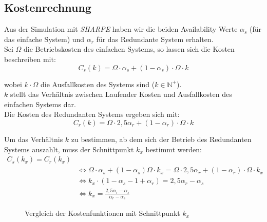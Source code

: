 \documentclass[
            a4paper
            ]{scrartcl}%
\begin{document}
\subsection{Kostenrechnung}
Aus der Simulation mit \emph{SHARPE} haben wir die beiden Availability Werte $\alpha_s$ (für das einfache System) und $\alpha_r$ für das Redundante System erhalten.\\
Sei $\Omega$ die Betriebskosten des einfachen Systems, so lassen sich die Kosten beschreiben mit:
\begin{equation}
C_s(k) = \Omega \cdot \alpha_s + (1-\alpha_s)\cdot \Omega \cdot k
\end{equation}

wobei $k \cdot \Omega$ die Ausfallkosten des Systems sind ($k \in
\mathbb{N}^+$).\\$k$ stellt das Verhältnis zwischen Laufender Kosten und Ausfallkosten des einfachen Systems dar.\\
Die Kosten des Redundanten Systems ergeben sich mit: 
\begin{equation}
C_r(k) = \Omega \cdot 2,5 \alpha_r + (1- \alpha_r) \cdot \Omega \cdot k
\end{equation}

Um das Verhältnis $k$ zu bestimmen, ab dem sich der Betrieb des Redundanten Systems auszahlt, muss der Schnittpunkt $k_x$ bestimmt werden:
\begin{equation}
\begin{split}
C_s(k_x) = C_r(k_x) \\ &
 \Leftrightarrow
\Omega \cdot \alpha_s + (1-\alpha_s)\Omega \cdot k_x = \Omega \cdot 2,5 \alpha_r + (1- \alpha_r) \cdot \Omega \cdot k_x \\ & \Leftrightarrow
k_x \cdot (1 - \alpha_s - 1 + \alpha_r) = 2,5 \alpha_r - \alpha_s \\ & \Leftrightarrow
k_x = \frac{2,5 \alpha_r - \alpha_s}{\alpha_r - \alpha_s}
\end{split}
\end{equation}

\begin{figure}
\centering
{}
\caption{Vergleich der Kostenfunktionen mit Schnittpunkt $k_x$}
\label{fig:mttf_result}
\end{figure}
\end{document}

